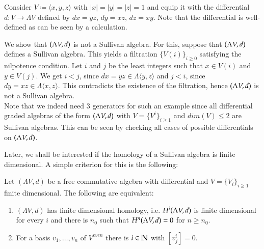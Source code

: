 \begin{Example}
 Consider  $V \coloneqq \langle x,y,z \rangle$ with $|x| = |y| = |z| = 1$ and 
 equip it with the differential $d \colon V \to \Lambda V$  defined by $dx = yz$, $dy = xz$, $dz = xy$.
 Note that the differential is well-defined as can be seen by a calculation.
 
 We show that $(\Lambda V,d)$ is not a Sullivan algebra.
 For this, suppose that $(\Lambda V,d)$ defines a Sullivan algebra. This yields a filtration ${\lbrace V(i) \rbrace}_{i \geq 0}$ satisfying
 the nilpotence condition. Let $i$ and $j$ be the least integers such that $x \in V(i)$ and $y \in V(j)$. We get
 $i < j$, since $dx = yz \in \Lambda \langle y,z \rangle$ and $j < i$, since $dy = xz \in \Lambda \langle x,z \rangle$.
 This contradicts the existence of the filtration, hence $(\Lambda V,d)$ is not a Sullivan algebra. \\
 Note that we indeed need $3$ generators for such an example since all differential graded algebras of the form
	$(\Lambda V,d)$ with $ V = {\lbrace V^i \rbrace}_{i \geq 1}$ and $dim (V) \leq 2$ are Sullivan algebras. This can be 
 seen by checking all cases of possible differentials on $(\Lambda V,d)$.
 \end{Example}
 
 Later, we shall be interested if the homology of a Sullivan algebra is finite dimensional. A simple criterion 
 for this is the following:
 \begin{Lemma}
  Let $(\Lambda V,d)$ be a free commutative algebra with differential and $V = {\lbrace V_i \rbrace}_{i \geq 1}$ finite dimensional.
  The following are equivalent:
  
  \begin{enumerate}
   \item\label{itm:lemmaItemOne} $(\Lambda V,d)$ has finite dimensional homology, i.e. $H^i (\Lambda V,d)$ is finite dimensional for every
   $i$ and there is $n_0$ such that  $H^n (\Lambda V,d) = 0$ for $n \geq n_0$.
   \item\label{itm:lemmaItemTwo} For a basis $ v_1, \ldots, v_n$ of $V^{even}$ there is 
  $i \in \mathbb{N}$ with $[v^i_j] = 0$.
  \end{enumerate}

 \end{Lemma}
 
